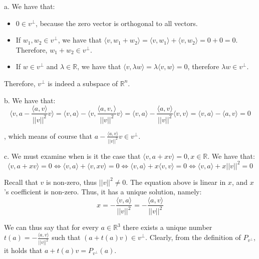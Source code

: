 \begin{solution}

    a. We have that:
    \begin{itemize}
        \item $0 \in v^\bot$, because the zero vector is orthogonal to all vectors.
        \item If $w_1, w_2 \in v^\bot$, we have that $\langle v, w_1 + w_2 \rangle = \langle v, w_1 \rangle + \langle v, w_2 \rangle = 0 + 0 = 0$. Therefore, $w_1 + w_2 \in v^\bot$.
        \item If $w \in v^\bot$ and $\lambda \in \mathbb{R}$, we have that $\langle v, \lambda w \rangle = \lambda \langle v, w \rangle = 0$, therefore $\lambda w \in v^\bot$.
    \end{itemize}

    Therefore, $v^\bot$ is indeed a subspace of $\mathbb{R}^n$.

    b. We have that:
    $$\langle v, a - \frac{\langle a, v \rangle}{\lvert \lvert v \rvert \rvert^2}v \rangle = \langle v, a \rangle - \langle v, \frac{\langle a, v, \rangle}{\lvert \lvert v \rvert \rvert^2}v \rangle = \langle v, a \rangle - \frac{\langle a, v \rangle}{\lvert \lvert v \rvert \rvert^2} \langle v, v \rangle = \langle v, a \rangle - \langle a, v \rangle = 0$$

    , which means of course that $ a - \frac{\langle a, v \rangle}{\lvert \lvert v \rvert \rvert^2}v \in v^\bot$.

    c. We must examine when is it the case that $\langle v, a +xv \rangle = 0, x \in \mathbb{R}$. We have that:
    $$\langle v, a + xv \rangle = 0 \iff \langle v, a \rangle + \langle v, xv \rangle = 0 \iff \langle v, a \rangle + x \langle v, v \rangle = 0 \iff \langle v, a \rangle + x \lvert \lvert v \rvert \rvert^2 = 0$$

    Recall that $v$ is non-zero, thus $\lvert \lvert v \rvert \rvert^2 \neq 0$. The equation above is linear in $x$, and $x$'s coefficient is non-zero. Thus, it has a unique solution, namely:
    $$x = -\frac{\langle v, a \rangle}{\lvert \lvert v \rvert \rvert^2} = -\frac{\langle a, v \rangle}{\lvert \lvert v \rvert \rvert^2}$$

    We can thus say that for every $a \in \mathbb{R}^3$ there exists a unique number $t(a) = -\frac{\langle a, v \rangle}{\lvert \lvert v \rvert \rvert^2}$ such that $(a + t(a)v) \in v^\bot$. Clearly, from the definition of $P_{v^{\bot}}$, it holds that $a+t(a)v = P_{v^\bot}(a)$.
\end{solution}

